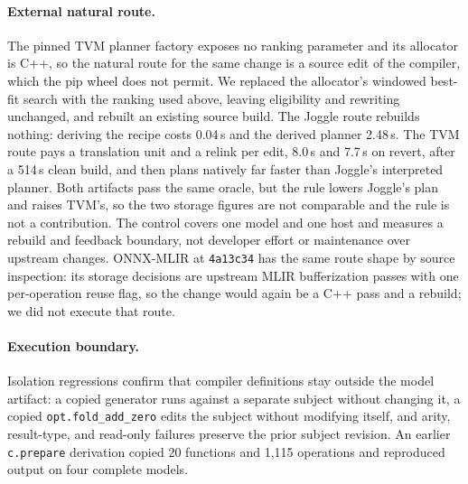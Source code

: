 \documentclass[sigplan,anonymous,review]{acmart}
\begin{document}
\paragraph{External natural route.}
The pinned TVM planner factory exposes no ranking parameter and its allocator is
C++, so the natural route for the same change is a source edit of the compiler,
which the pip wheel does not permit. We replaced the allocator's windowed
best-fit search with the ranking used above, leaving eligibility and rewriting
unchanged, and rebuilt an existing source build. The Joggle route rebuilds
nothing: deriving the recipe costs 0.04\,s and the derived planner 2.48\,s. The
TVM route pays a translation unit and a relink per edit, 8.0\,s and 7.7\,s on
revert, after a 514\,s clean build, and then plans natively far faster than
Joggle's interpreted planner. Both artifacts pass the same oracle, but the rule
lowers Joggle's plan and raises TVM's, so the two storage figures are not
comparable and the rule is not a contribution.
The control covers one model and one host and measures a rebuild and
feedback boundary, not developer effort or maintenance over upstream changes.
ONNX-MLIR at \texttt{4a13c34} has the same route shape by source inspection:
its storage decisions are upstream MLIR bufferization passes with one
per-operation reuse flag, so the change would again be a C++ pass and a
rebuild; we did not execute that route.

\paragraph{Execution boundary.}
Isolation regressions confirm that compiler definitions stay outside the
model artifact: a copied generator runs against a separate subject without
changing it, a copied \texttt{opt.fold\_add\_zero} edits the subject without
modifying itself, and arity, result-type, and read-only failures preserve the
prior subject revision. An earlier \texttt{c.prepare} derivation copied 20
functions and 1,115 operations and reproduced output on four complete models.
\end{document}
